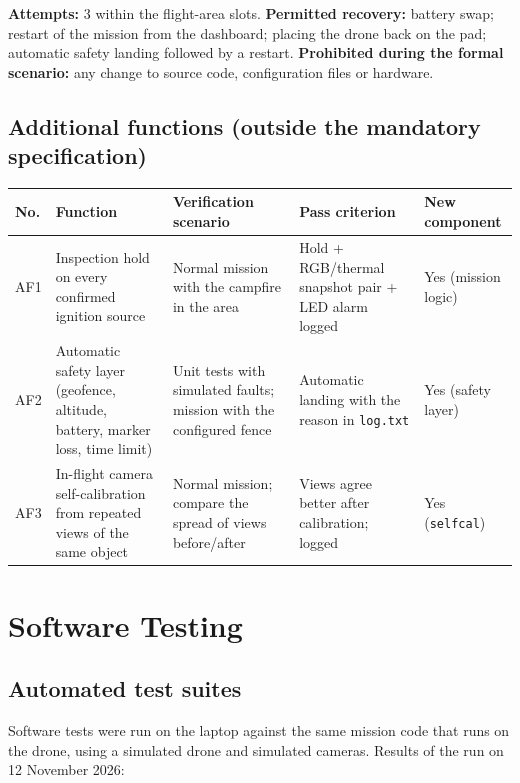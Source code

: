\documentclass[10pt,a4paper]{article}
\newcommand{\head}[1]{\textbf{#1}}
\newcommand{\file}[1]{\texttt{\small #1}}
\begin{document}
\textbf{Attempts:} 3 within the flight-area slots. \textbf{Permitted recovery:} battery swap; restart of the mission from
the dashboard; placing the drone back on the pad; automatic safety landing followed by a restart.
\textbf{Prohibited during the formal scenario:} any change to source code, configuration files or hardware.

\subsection{Additional functions (outside the mandatory specification)}
\begin{tabularx}{\textwidth}{|L{0.8cm}|L{4.2cm}|Y|L{3.0cm}|L{2.1cm}|}
\hline
{}\head{No.} & \head{Function} & \head{Verification scenario} & \head{Pass criterion} & \head{New component} \\ \hline
AF1 & Inspection hold on every confirmed ignition source & Normal mission with the campfire in the area & Hold + RGB/thermal snapshot pair + LED alarm logged & Yes (mission logic) \\ \hline
AF2 & Automatic safety layer (geofence, altitude, battery, marker loss, time limit) & Unit tests with simulated faults; mission with the configured fence & Automatic landing with the reason in \file{log.txt} & Yes (safety layer) \\ \hline
AF3 & In-flight camera self-calibration from repeated views of the same object & Normal mission; compare the spread of views before/after & Views agree better after calibration; logged & Yes (\file{selfcal}) \\ \hline
\end{tabularx}

\section{Software Testing}

\subsection{Automated test suites}
Software tests were run on the laptop against the same mission code that runs on the drone, using a simulated drone and
simulated cameras. Results of the run on 12 November 2026:
\end{document}
